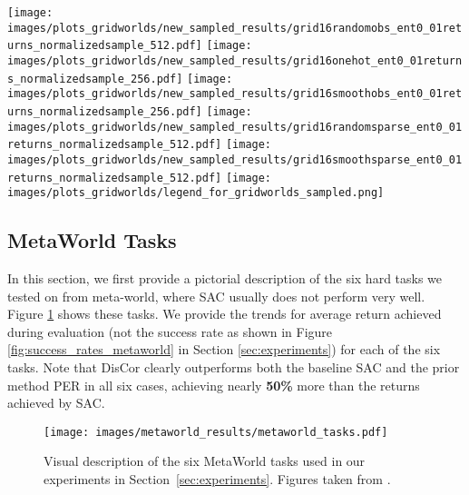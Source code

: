 \documentclass[jmlr]{article}
\begin{document}
\begin{figure*}
    \centering
    \texttt{[image: images/plots\_gridworlds/new\_sampled\_results/grid16randomobs\_ent0\_01returns\_normalizedsample\_512.pdf]}
    \texttt{[image: images/plots\_gridworlds/new\_sampled\_results/grid16onehot\_ent0\_01returns\_normalizedsample\_256.pdf]}
    \texttt{[image: images/plots\_gridworlds/new\_sampled\_results/grid16smoothobs\_ent0\_01returns\_normalizedsample\_256.pdf]}
    \vline
    \texttt{[image: images/plots\_gridworlds/new\_sampled\_results/grid16randomsparse\_ent0\_01returns\_normalizedsample\_512.pdf]}
    \texttt{[image: images/plots\_gridworlds/new\_sampled\_results/grid16smoothsparse\_ent0\_01returns\_normalizedsample\_512.pdf]}
    \texttt{[image: images/plots\_gridworlds/legend\_for\_gridworlds\_sampled.png]}
    \caption{\footnotesize{Learning curves for different algorithms in the \textbf{sampled} setting. Note that DisCor and DisCor (oralce) anre generally the best algorithms in these settings. Replay Buffers (green) help over on-policy (gray) distributions, but may the algorithm may still fail to reach optimal return. Prioritizing for high Bellman error (PER) may fail to learn in sparse-reward tasks as is evident from the curves for sparse reward environments (\textbf{right} of the vertical line).}}
    \label{fig:sampled_fqi_runs}
\end{figure*}

\vspace{-10pt}
\subsection{MetaWorld Tasks}
\label{sec:app_exps_metaworld}
In this section, we first provide a pictorial description of the six hard tasks we tested on from meta-world, where SAC usually does not perform very well. Figure \ref{fig:metaworld_tasks} shows these tasks. We provide the trends for average return achieved during evaluation (not the success rate as shown in Figure \ref{fig:success_rates_metaworld} in Section \ref{sec:experiments}) for each of the six tasks. Note that DisCor clearly outperforms both the baseline SAC and the prior method PER in all six cases, achieving nearly \textbf{50\%} more than the returns achieved by SAC. 

\begin{figure}[ht]
    \centering
    \texttt{[image: images/metaworld\_results/metaworld\_tasks.pdf]}
    \caption{\footnotesize{Visual description of the six MetaWorld tasks used in our experiments in Section~\ref{sec:experiments}. Figures taken from \cite{yu2019meta}.}}
    \label{fig:metaworld_tasks}
\end{figure}
\end{document}
